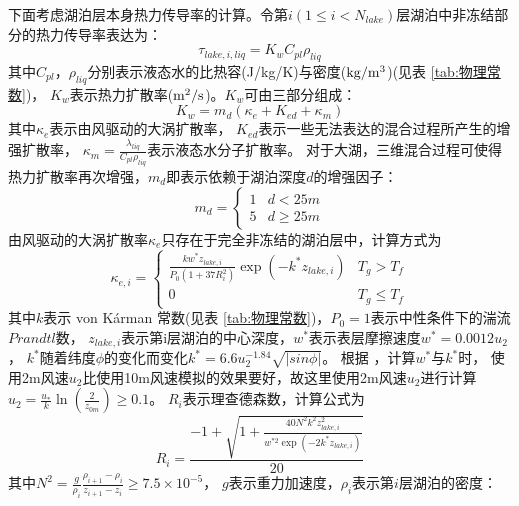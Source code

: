 下面考虑湖泊层本身热力传导率的计算。令第$i\left(1\le i<N_{lake}\right)$层湖泊中非冻结部分的热力传导率表达为：
\begin{equation}
\tau_{lake, i, liq}=K_{w} C_{p l} \rho_{liq}
\end{equation}
其中$C_{pl}$，$\rho_{liq}$分别表示液态水的比热容(J/kg/K)与密度($\rm kg/m^3$)(见表 \ref{tab:物理常数})，
$K_w$表示热力扩散率($\rm m^2/s$)。$K_w$可由三部分组成\citep{subin2012improved}：
\begin{equation}
K_{w}=m_{d}\left(\kappa_{e}+K_{e d}+\kappa_{m}\right)
\end{equation}
其中$\kappa_e$表示由风驱动的大涡扩散率\citep{hostetler1990simulation}，
$K_{ed}$表示一些无法表达的混合过程所产生的增强扩散率\citep{fang1996long}，
$\kappa_m=\frac{\lambda_{liq}}{C_{pl}\rho_{liq}}$表示液态水分子扩散率。
对于大湖，三维混合过程可使得热力扩散率再次增强，$m_d$即表示依赖于湖泊深度$d$的增强因子：
\begin{equation}
m_{d}=\left\{\begin{array}{ll}1 & d<25 m \\ 5 & d \geq 25 m\end{array}\right.
\end{equation}
由风驱动的大涡扩散率$\kappa_e$只存在于完全非冻结的湖泊层中，计算方式为
\begin{equation}
\kappa_{e, i}=\left\{\begin{array}{ll}\frac{k w^{*} z_{lake, i}}{P_{0}\left(1+37 R_{i}^{2}\right)} 
    \exp \left(-k^{*} z_{lake, i}\right) & T_{g}>T_{f} \\ 0 & T_{g} \leq T_{f}\end{array}\right.
\end{equation}
其中$k$表示 von K\'arman 常数(见表 \ref{tab:物理常数})，$P_0=1$表示中性条件下的湍流$Prandtl$数，
$z_{lake,i}$表示第i层湖泊的中心深度，$w^\ast$表示表层摩擦速度$w^\ast=0.0012u_2$，
$k^\ast$随着纬度$\phi$的变化而变化$k^\ast=6.6u_2^{-1.84}\sqrt{\left|sin\phi\right|}$。
根据 \citet{hostetler1990simulation}，计算$w^\ast$与$k^\ast$时，
使用2m风速$u_2$比使用10m风速模拟的效果要好，故这里使用2m风速$u_2$进行计算$u_2=\frac{u_\ast}{k}\ln{\left(\frac{2}{z_{0m}}\right)}\geq0.1$。
$R_i$表示理查德森数，计算公式为
\begin{equation}
R_{i}=\frac{-1+\sqrt{\left.1+\frac{40 N^{2} k^{2} z_{lake, i}^{2}}{w^{* 2} \exp \left(-2 k^{*} z_{lake, i}\right)}\right.}}{20}
\end{equation}
其中$N^2=\frac{g}{\rho_i}\frac{\rho_{i+1}-\rho_i}{z_{i+1}-z_i}\geq7.5\times{10}^{-5}$，
$g$表示重力加速度，$\rho_i$表示第$i$层湖泊的密度\citep{hostetler1990simulation}：
